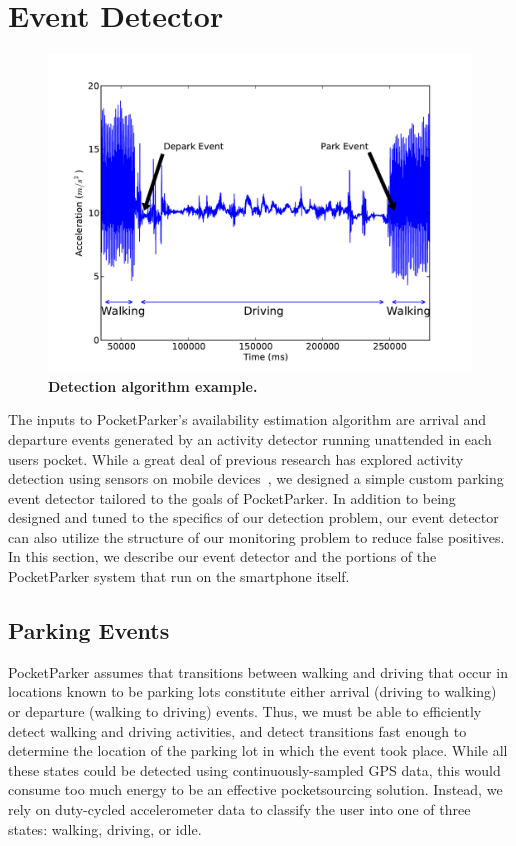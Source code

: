 \section{Event Detector}
\label{sec-detector}

\begin{figure}
\centering
\includegraphics[width=\columnwidth]{./figures/Detection.pdf}

\caption{\textbf{Detection algorithm example.} }

\label{fig-detectionexample}
\end{figure}

The inputs to PocketParker's availability estimation algorithm are arrival
and departure events generated by an activity detector running unattended in
each users pocket. While a great deal of previous research has explored
activity detection using sensors on mobile devices~\cite{FIXME}, we designed a
simple custom parking event detector tailored to the goals of PocketParker.
In addition to being designed and tuned to the specifics of our detection
problem, our event detector can also utilize the structure of our monitoring
problem to reduce false positives. In this section, we describe our event
detector and the portions of the PocketParker system that run on the
smartphone itself.

\subsection{Parking Events}
\label{subsec-goals}

PocketParker assumes that transitions between walking and driving that occur
in locations known to be parking lots constitute either arrival (driving to
walking) or departure (walking to driving) events. Thus, we must be able to
efficiently detect walking and driving activities, and detect transitions
fast enough to determine the location of the parking lot in which the event
took place. While all these states could be detected using
continuously-sampled GPS data, this would consume too much energy to be an
effective pocketsourcing solution. Instead, we rely on duty-cycled
accelerometer data to classify the user into one of three states: walking,
driving, or idle.

